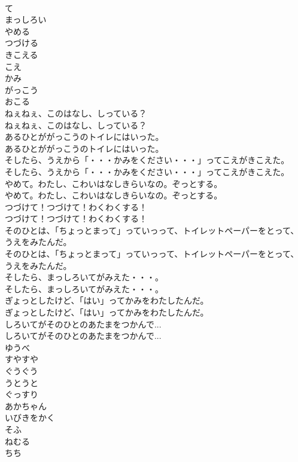 \documentclass[8pt]{extreport}
\begin{document}
\begin{CJK}{UTF8}{min}
\\	て
\\	まっしろい
\\	やめる
\\	つづける
\\	きこえる
\\	こえ
\\	かみ
\\	がっこう
\\	おこる
\\	ねぇねぇ、このはなし、しっている？
\\	ねぇねぇ、このはなし、しっている？
\\	あるひとががっこうのトイレにはいった。
\\	あるひとががっこうのトイレにはいった。
\\	そしたら、うえから「・・・かみをください・・・」ってこえがきこえた。
\\	そしたら、うえから「・・・かみをください・・・」ってこえがきこえた。
\\	やめて。わたし、こわいはなしきらいなの。ぞっとする。
\\	やめて。わたし、こわいはなしきらいなの。ぞっとする。
\\	つづけて！つづけて！わくわくする！
\\	つづけて！つづけて！わくわくする！
\\	そのひとは、「ちょっとまって」っていっって、トイレットペーパーをとって、うえをみたんだ。
\\	そのひとは、「ちょっとまって」っていっって、トイレットペーパーをとって、うえをみたんだ。
\\	そしたら、まっしろいてがみえた・・・。
\\	そしたら、まっしろいてがみえた・・・。
\\	ぎょっとしたけど、「はい」ってかみをわたしたんだ。
\\	ぎょっとしたけど、「はい」ってかみをわたしたんだ。
\\	しろいてがそのひとのあたまをつかんで...
\\	しろいてがそのひとのあたまをつかんで...
\\	ゆうべ
\\	すやすや
\\	ぐうぐう
\\	うとうと
\\	ぐっすり
\\	あかちゃん
\\	いびきをかく
\\	そふ
\\	ねむる
\\	ちち

\end{CJK}
\end{document}
